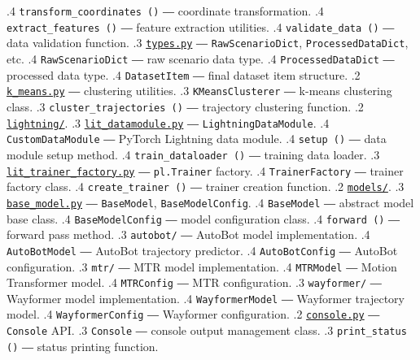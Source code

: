 {.4 \texttt{transform\_coordinates ()} ― coordinate transformation.
.4 \texttt{extract\_features ()} ― feature extraction utilities.
.4 \texttt{validate\_data ()} ― data validation function.
.3 \href{https://github.com/JanDuchscherer104/UniTraj/blob/main/unitraj/datasets/types.py}{\texttt{types.py}} ― \texttt{RawScenarioDict}, \texttt{ProcessedDataDict}, etc.
.4 \texttt{RawScenarioDict} ― raw scenario data type.
.4 \texttt{ProcessedDataDict} ― processed data type.
.4 \texttt{DatasetItem} ― final dataset item structure.
.2 \href{https://github.com/JanDuchscherer104/UniTraj/blob/main/unitraj/k_means.py}{\texttt{k\_means.py}} ― clustering utilities.
.3 \texttt{KMeansClusterer} ― k-means clustering class.
.3 \texttt{cluster\_trajectories ()} ― trajectory clustering function.
.2 \href{https://github.com/JanDuchscherer104/UniTraj/blob/main/unitraj/lightning/}{\texttt{lightning/}}.
.3 \href{https://github.com/JanDuchscherer104/UniTraj/blob/main/unitraj/lightning/lit_datamodule.py}{\texttt{lit\_datamodule.py}} ― \texttt{LightningDataModule}.
.4 \texttt{CustomDataModule} ― PyTorch Lightning data module.
.4 \texttt{setup ()} ― data module setup method.
.4 \texttt{train\_dataloader ()} ― training data loader.
.3 \href{https://github.com/JanDuchscherer104/UniTraj/blob/main/unitraj/lightning/lit_trainer_factory.py}{\texttt{lit\_trainer\_factory.py}} ― \texttt{pl.Trainer} factory.
.4 \texttt{TrainerFactory} ― trainer factory class.
.4 \texttt{create\_trainer ()} ― trainer creation function.
.2 \href{https://github.com/JanDuchscherer104/UniTraj/blob/main/unitraj/models/}{\texttt{models/}}.
.3 \href{https://github.com/JanDuchscherer104/UniTraj/blob/main/unitraj/models/base_model/base_model.py}{\texttt{base\_model.py}} ― \texttt{BaseModel}, \texttt{BaseModelConfig}.
.4 \texttt{BaseModel} ― abstract model base class.
.4 \texttt{BaseModelConfig} ― model configuration class.
.4 \texttt{forward ()} ― forward pass method.
.3 \texttt{autobot/} ― AutoBot model implementation.
.4 \texttt{AutoBotModel} ― AutoBot trajectory predictor.
.4 \texttt{AutoBotConfig} ― AutoBot configuration.
.3 \texttt{mtr/} ― MTR model implementation.
.4 \texttt{MTRModel} ― Motion Transformer model.
.4 \texttt{MTRConfig} ― MTR configuration.
.3 \texttt{wayformer/} ― Wayformer model implementation.
.4 \texttt{WayformerModel} ― Wayformer trajectory model.
.4 \texttt{WayformerConfig} ― Wayformer configuration.
.2 \href{https://github.com/JanDuchscherer104/UniTraj/blob/main/unitraj/utils/console.py}{\texttt{console.py}} ― \texttt{Console} API\@.
.3 \texttt{Console} ― console output management class.
.3 \texttt{print\_status ()} ― status printing function.
}
